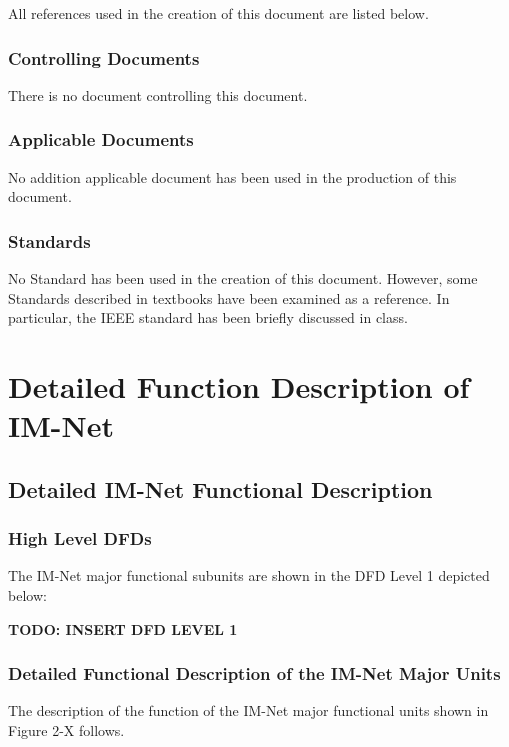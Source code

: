 \documentclass[letterpaper]{article}
\begin{document}
All references used in the creation of this document are listed below.

\subsubsection{Controlling Documents}

There is no document controlling this document.

\subsubsection{Applicable Documents}

No addition applicable document has been used in the production of this document.

\subsubsection{Standards}

No Standard has been used in the creation of this document. However, some Standards described in textbooks have been examined as a reference. In particular, the IEEE standard has been briefly discussed in class.

\eject

\section{Detailed Function Description of IM-Net}

\subsection{Detailed IM-Net Functional Description}

\subsubsection{High Level DFDs}

The IM-Net major functional subunits are shown in the DFD Level 1 depicted below:

\textbf{TODO: INSERT DFD LEVEL 1}

 
\subsubsection{Detailed Functional Description of the IM-Net Major Units}

The description of the function of the IM-Net major functional units shown in Figure 2-X follows.
\end{document}
